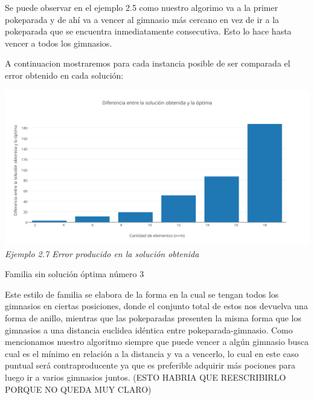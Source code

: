 Se puede observar en el ejemplo 2.5 como nuestro algorimo va a la primer pokeparada y de ah\'i va a vencer al gimnasio m\'as cercano en vez de ir a la pokeparada que se encuentra inmediatamente consecutiva. Esto lo hace hasta vencer a todos los gimnasios.

A continuacion mostraremos para cada instancia posible de ser comparada el error obtenido en cada soluci\'on:

\vspace*{0.3cm} \vspace*{0.3cm}
  \begin{center}
\includegraphics[scale=0.60]{./EJ2/sinOrden.png}
\\{\textit{Ejemplo 2.7 Error producido en la soluci\'on obtenida}}
  \end{center}
  \vspace*{0.3cm}


\begin{center}
Familia sin soluci\'on \'optima n\'umero 3
\end{center}

Este estilo de familia se elabora de la forma en la cual se tengan todos los gimnasios en ciertas posiciones, donde el conjunto total de estos nos devuelva una forma de anillo, mientras que las pokeparadas presenten la misma forma que los gimnasios a una distancia euclidea id\'entica entre pokeparada-gimnasio. Como mencionamos nuestro algoritmo siempre que puede vencer a alg\'un gimnasio busca cual es el m\'inimo en relaci\'on a la distancia y va a vencerlo, lo cual en este caso puntual ser\'a contraproducente ya que es preferible adquirir m\'as pociones para luego ir a varios gimnasios juntos. (ESTO HABRIA QUE REESCRIBIRLO PORQUE NO QUEDA MUY CLARO)


